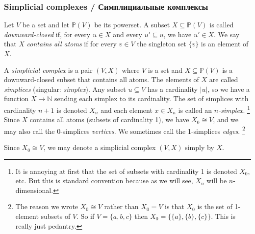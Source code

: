 \documentclass{book}
\def\PP{{\mathbb P}}
\def\NN{{\mathbb N}}
\def\to{\rightarrow}
\def\ss{\subseteq}
\def\iso{\cong}
\theoremstyle{theoremENG}
\theoremstyle{lemmaENG}
\theoremstyle{propositionENG}
\theoremstyle{corollaryENG}
\theoremstyle{factENG}
\theoremstyle{remarkENG}
\theoremstyle{exampleENG}
\newtheorem{exampleENG}[subsubsection]{\begin{english}Example\end{english}}
\theoremstyle{warningENG}
\theoremstyle{questionENG}
\theoremstyle{guessENG}
\theoremstyle{answerENG}
\theoremstyle{constructionENG}
\theoremstyle{rulesENG}
\theoremstyle{excENG}
\theoremstyle{appENG}
\theoremstyle{definitionENG}
\newtheorem{definitionENG}[subsubsection]{\begin{english}Definition\end{english}}
\theoremstyle{notationENG}
\theoremstyle{conjectureENG}
\theoremstyle{postulateENG}
\theoremstyle{theoremRUS}
\theoremstyle{lemmaRUS}
\theoremstyle{propositionRUS}
\theoremstyle{corollaryRUS}
\theoremstyle{factRUS}
\theoremstyle{remarkRUS}
\theoremstyle{exampleRUS}
\theoremstyle{warningRUS}
\theoremstyle{questionRUS}
\theoremstyle{guessRUS}
\theoremstyle{answerRUS}
\theoremstyle{constructionRUS}
\theoremstyle{rulesRUS}
\theoremstyle{excRUS}
\theoremstyle{appRUS}
\theoremstyle{definitionRUS}
\theoremstyle{notationRUS}
\theoremstyle{conjectureRUS}
\theoremstyle{postulateRUS}
\begin{document}
\begin{english}

\subsubsection{Simplicial complexes / Симплициальные комплексы}\label{sec:simplicial complex}

\begin{definitionENG}\label{def:simplicial complex}

Let $V$ be a set and let $\PP(V)$ be its powerset. A subset $X\ss\PP(V)$ is called {\em downward-closed} if, for every $u\in X$ and every $u'\ss u$, we have $u'\in X$. We say that $X$ {\em contains all atoms} if for every $v\in V$ the singleton set $\{v\}$ is an element of $X$. 

\begin{russian} \end{russian}

A {\em simplicial complex} is a pair $(V,X)$ where $V$ is a set and $X\ss\PP(V)$ is a downward-closed subset that contains all atoms. The elements of $X$ are called {\em simplices} (singular: {\em simplex}). Any subset $u\ss V$ has a cardinality $|u|$, so we have a function $X\to\NN$ sending each simplex to its cardinality. The set of simplices with cardinality $n+1$ is denoted $X_n$ and each element $x\in X_n$ is called an {\em $n$-simplex}.
\footnote{It is annoying at first that the set of subsets with cardinality 1 is denoted $X_0$, etc. But this is standard convention because as we will see, $X_n$ will be $n$-dimensional.}
Since $X$ contains all atoms (subsets of cardinality 1), we have $X_0\iso V$, and we may also call the 0-simplices {\em vertices}. We sometimes call the 1-simplices {\em edges}.
\footnote{The reason we wrote $X_0\iso V$ rather than $X_0=V$ is that $X_0$ is the set of 1-element subsets of $V$. So if $V=\{a,b,c\}$ then $X_0=\{\{a\},\{b\},\{c\}\}$. This is really just pedantry.}

\begin{russian} \end{russian}

Since $X_0\iso V$, we may denote a simplicial complex $(V,X)$ simply by $X$.

\begin{russian} \end{russian}

\end{definitionENG}

\begin{exampleENG}


\end{exampleENG}
\end{english}
\end{document}
